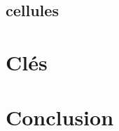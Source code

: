 \documentclass[12pt]{article}
\begin{document}
\subsection{cellules}

\section{Clés}



\section{Conclusion}
\end{document}
